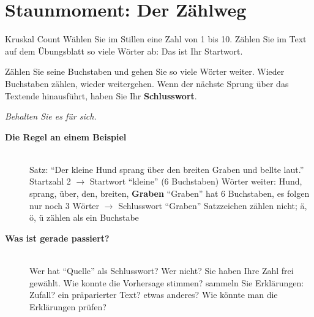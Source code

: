 \section{Staunmoment: Der Zählweg}
\begin{staunbox}{Kruskal Count}
Wählen Sie im Stillen eine Zahl von 1 bis 10. Zählen Sie im Text auf dem
Übungsblatt so viele Wörter ab: Das ist Ihr Startwort.

\medskip
Zählen Sie seine Buchstaben und gehen Sie so viele Wörter weiter. Wieder
Buchstaben zählen, wieder weitergehen. Wenn der nächste Sprung über das
Textende hinausführt, haben Sie Ihr \textbf{Schlusswort}.

\medskip
\emph{Behalten Sie es für sich.}
\end{staunbox}
\os{\newpage}

\begin{description}
\item[{\rot\bf Die Regel an einem Beispiel}]~\\[-\lblskip]
\bi
  \ite Satz: \enquote{Der kleine Hund sprang über den breiten Graben und
    bellte laut.}
  \ite Startzahl 2 $\to$ Startwort \enquote{kleine} (6 Buchstaben)
   Wörter weiter: Hund, sprang, über, den, breiten, \textbf{Graben}
  \ite \enquote{Graben} hat 6 Buchstaben, es folgen nur noch 3 Wörter
    $\to$ Schlusswort \enquote{Graben}
  \ite Satzzeichen zählen nicht; ä, ö, ü zählen als ein Buchstabe
\ei
{}
\os{\newpage}

\item[{\rot\bf Was ist gerade passiert?}]~\\[-\lblskip]
\bi
  \ite Wer hat \enquote{Quelle} als Schlusswort? Wer nicht?
  \ite Sie haben Ihre Zahl frei gewählt. Wie konnte die Vorhersage
    stimmen?
  \ite sammeln Sie Erklärungen: Zufall? ein präparierter Text? etwas
    anderes?
  \ite Wie könnte man die Erklärungen prüfen?
\ei
{}
\os{\newpage}
\end{description}

